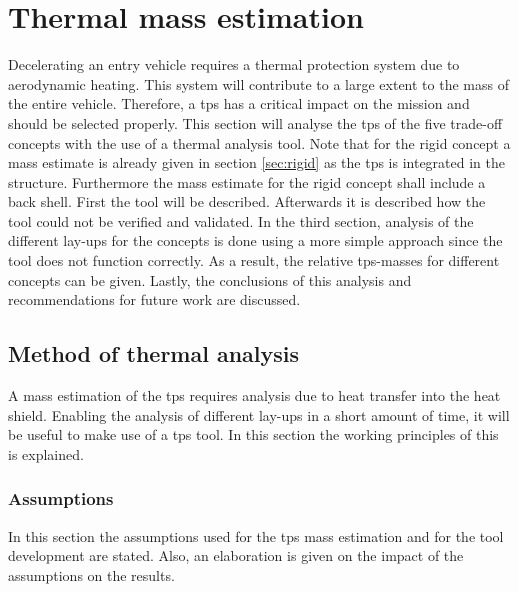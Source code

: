 \section{Thermal mass estimation}
\label{ch:thermtool}

Decelerating an entry vehicle requires a thermal protection system due to aerodynamic heating. This system will contribute to a large extent to the mass of the entire vehicle. Therefore, a \acrfull{tps} has a critical impact on the mission and should be selected properly. This section will analyse the \gls{tps} of the five trade-off concepts with the use of a thermal analysis tool. Note that for the rigid concept a mass estimate is already given in section \ref{sec:rigid} as the \gls{tps} is integrated in the structure. Furthermore the mass estimate for the rigid concept shall include a back shell. First the tool will be described. Afterwards it is described how the tool could not be verified and validated. In the third section, analysis of the different lay-ups for the concepts is done using a more simple approach since the tool does not function correctly. As a result, the relative \gls{tps}-masses for different concepts can be given. Lastly, the conclusions of this analysis and recommendations for future work are discussed.

\subsection{Method of thermal analysis}
A mass estimation of the \gls{tps} requires analysis due to heat transfer into the heat shield. Enabling the analysis of different lay-ups in a short amount of time, it will be useful to make use of a \gls{tps} tool. In this section the working principles of this is explained.

\subsubsection{Assumptions}
In this section the assumptions used for the \gls{tps} mass estimation and for the tool development are stated. Also, an elaboration is given on the impact of the assumptions on the results.

